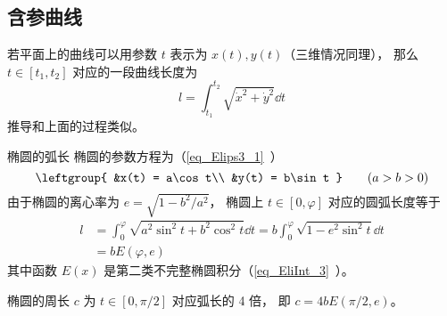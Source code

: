 \subsection{含参曲线}
若平面上的曲线可以用参数 $t$ 表示为 $x(t), y(t)$（三维情况同理）， 那么 $t \in [t_1, t_2]$ 对应的一段曲线长度为
\begin{equation}\label{eq_CurLen_2}
l = \int_{t_1}^{t_2} \sqrt{\dot x^2 + \dot y^2} \dd{t}
\end{equation}
推导和上面的过程类似。

\begin{example}{椭圆的弧长}\label{ex_CurLen_1}
椭圆的参数方程为（\autoref{eq_Elips3_1}~）
\begin{equation}
\leftgroup{
&x(t) = a\cos t\\
&y(t) = b\sin t
} \qquad
(a > b > 0)
\end{equation}
由于椭圆的离心率为 $e = \sqrt{1 - b^2/a^2}$， 椭圆上 $t \in [0, \varphi]$ 对应的圆弧长度等于
\begin{equation}
\begin{aligned}
l &= \int_0^{\varphi} \sqrt{a^2\sin^2 t + b^2 \cos^2 t} \dd{t}
= b\int_0^\varphi \sqrt{1 - e^2\sin^2 t} \dd{t}\\
&= b E(\varphi, e)
\end{aligned}
\end{equation}
其中函数 $E(x)$ 是第二类不完整椭圆积分（\autoref{eq_EliInt_3}~）。

椭圆的周长 $c$ 为 $t \in [0, \pi/2]$ 对应弧长的 4 倍， 即 $c = 4bE(\pi/2, e)$。
\end{example}
